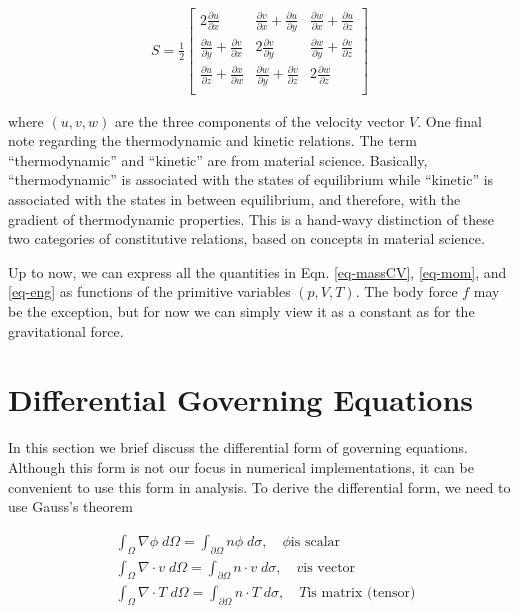 \documentclass[12pt, letterpaper]{report}
\begin{document}
\begin{align*}
   S = \frac{1}{2}
   \begin{bmatrix}
      2\frac{\partial u}{\partial x} & \frac{\partial v}{\partial x}+\frac{\partial u}{\partial y} &
      \frac{\partial w}{\partial x} + \frac{\partial u}{\partial z} \\
      \frac{\partial u}{\partial y} + \frac{\partial v}{\partial x} & 2\frac{\partial v}{\partial y} &
      \frac{\partial w}{\partial y} + \frac{\partial v}{\partial z} \\
      \frac{\partial u}{\partial z} + \frac{\partial x}{\partial w} & \frac{\partial w}{\partial y}
      + \frac{\partial v}{\partial z} &   2\frac{\partial w}{\partial z} \\
   \end{bmatrix}
\end{align*}

where $(u,v,w)$ are the three components of the velocity vector $V$. One final note regarding the
thermodynamic and kinetic relations. The term ``thermodynamic'' and ``kinetic'' are from material
science. Basically, ``thermodynamic'' is associated with the states of equilibrium while
``kinetic'' is associated with the states in between equilibrium, and therefore, with the gradient
of thermodynamic properties. This is a hand-wavy distinction of these two categories of constitutive
relations, based on concepts in material science.
\paraspace

Up to now, we can express all the quantities in Eqn. \ref{eq-massCV}, \ref{eq-mom}, and \ref{eq-eng}
as functions of the primitive variables $(p,V,T)$. The body force $f$ may be the exception, but for
now we can simply view it as a constant as for the gravitational force.
\paraspace

\section{Differential Governing Equations}

In this section we brief discuss the differential form of governing equations. Although this form is
not our focus in numerical implementations, it can be convenient to use this form in analysis. To
derive the differential form, we need to use Gauss's theorem

\begin{subequations}\label{eq-Gaussthm}
   \begin{align}
      &\int_\Omega \nabla \phi \; d\Omega = \int_{\partial\Omega} n\phi \; d\sigma, \quad \phi \textrm{
         is scalar} \\
      &\int_\Omega \nabla \cdot v \; d\Omega = \int_{\partial\Omega} n \cdot v \; d\sigma, \quad v \textrm{
         is vector} \\
      &\int_\Omega \nabla \cdot T \; d\Omega = \int_{\partial\Omega} n \cdot T \; d\sigma, \quad T \textrm{
         is matrix (tensor)}
   \end{align}
\end{subequations}
\end{document}
